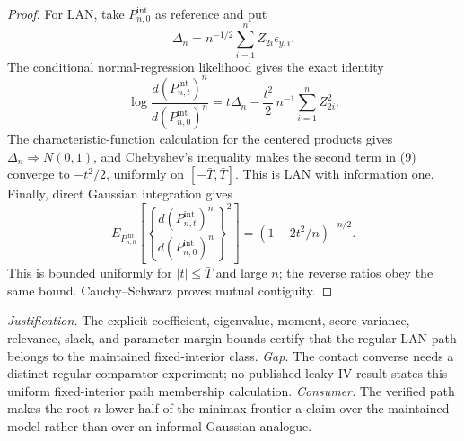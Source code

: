 \documentclass{article}
\begin{document}
\begin{proof}
For LAN, take \(P_{n,0}^{\mathrm{int}}\) as reference and put
\[
 \Delta_n=n^{-1/2}\sum_{i=1}^nZ_{2i}\epsilon_{y,i}.
\]
The conditional normal-regression likelihood gives the exact identity
\[
 \log\frac{d(P_{n,t}^{\mathrm{int}})^n}
 {d(P_{n,0}^{\mathrm{int}})^n}
 =t\Delta_n-\frac{t^2}{2}\,n^{-1}\sum_{i=1}^nZ_{2i}^2. \tag{9}
\]
The characteristic-function calculation for the centered products gives \(\Delta_n\Rightarrow N(0,1)\), and Chebyshev's inequality makes the second term in (9) converge to \(-t^2/2\), uniformly on \([ -\bar T,\bar T]\). This is LAN with information one. Finally, direct Gaussian integration gives
\[
 E_{P_{n,0}^{\mathrm{int}}}\!\left[
 \left\{\frac{d(P_{n,t}^{\mathrm{int}})^n}
 {d(P_{n,0}^{\mathrm{int}})^n}\right\}^{\!2}\right]
 =(1-2t^2/n)^{-n/2}. \tag{10}
\]
This is bounded uniformly for \(|t|\leq\bar T\) and large \(n\); the reverse ratios obey the same bound. Cauchy--Schwarz proves mutual contiguity.
\end{proof}
\par\smallskip\noindent \textit{Justification.} The explicit coefficient, eigenvalue, moment, score-variance, relevance, slack, and parameter-margin bounds certify that the regular LAN path belongs to the maintained fixed-interior class. \textit{Gap.} The contact converse needs a distinct regular comparator experiment; no published leaky-IV result states this uniform fixed-interior path membership calculation. \textit{Consumer.} The verified path makes the root-\(n\) lower half of the minimax frontier a claim over the maintained model rather than over an informal Gaussian analogue.
\end{document}

